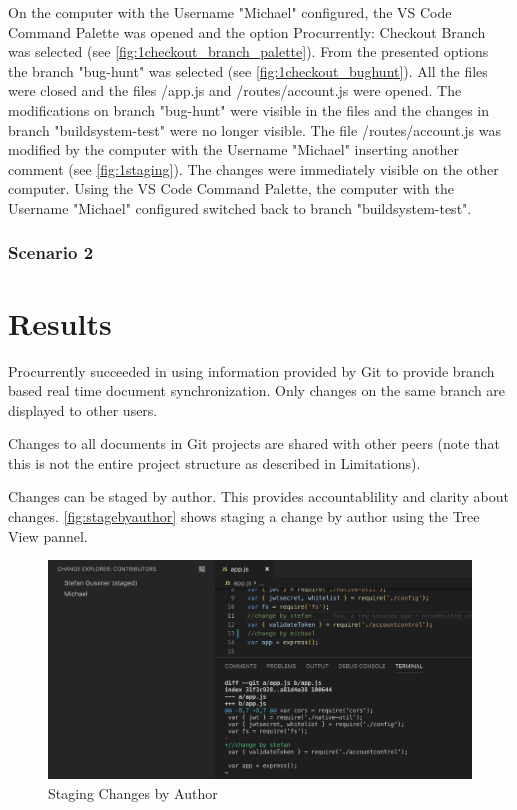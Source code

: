 On the computer with the Username "Michael" configured, the VS Code Command Palette was opened and the option Procurrently: Checkout Branch was selected (see \autoref{fig:1checkout_branch_palette}). From the presented options the branch "bug-hunt" was selected (see \autoref{fig:1checkout_bughunt}). All the files were closed and the files /app.js and /routes/account.js were opened. The modifications on branch "bug-hunt" were visible in the files and the changes in branch "buildsystem-test" were no longer visible. The file /routes/account.js was modified by the computer with the Username "Michael" inserting another comment (see \autoref{fig:1staging}). The changes were immediately visible on the other computer. Using the VS Code Command Palette, the computer with the Username "Michael" configured switched back to branch "buildsystem-test".

\subsubsection{Scenario 2}



\section{Results}
Procurrently succeeded in using information provided by Git to provide branch based real time document synchronization. Only changes on the same branch are displayed to other users.

Changes to all documents in Git projects are shared with other peers (note that this is not the entire project structure as described in Limitations).

Changes can be staged by author. This provides accountablility and clarity about changes. \autoref{fig:stagebyauthor} shows staging a change by author using the Tree View pannel. 

\begin{figure}[hb]
    \centering
    \includegraphics[width=150mm]{figures/screenshots/stage-by-author.png}
	\caption{Staging Changes by Author}
    \label{fig:stagebyauthor}
\end{figure}

